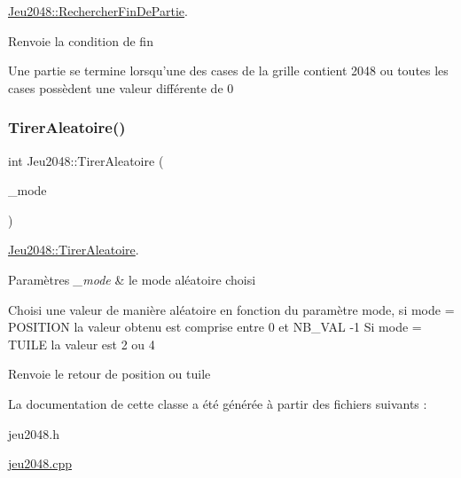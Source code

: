 \hyperlink{class_jeu2048_aa894974e64fc2dd2258b81fd975cdeb3}{Jeu2048\+::\+Rechercher\+Fin\+De\+Partie}. 

\begin{DoxyReturn}{Renvoie}
la condition de fin
\end{DoxyReturn}
Une partie se termine lorsqu’une des cases de la grille contient 2048 ou toutes les cases possèdent une valeur différente de 0 \mbox{\label{class_jeu2048_a5ce3049c89c0dcafc7636cfaf710f07f}} 
\subsubsection{\texorpdfstring{Tirer\+Aleatoire()}{TirerAleatoire()}}
{\footnotesize\ttfamily int Jeu2048\+::\+Tirer\+Aleatoire (\begin{DoxyParamCaption}\item[{const M\+O\+D\+E\+\_\+\+A\+L\+E\+A\+T\+O\+I\+RE}]{\+\_\+mode }\end{DoxyParamCaption})\hspace{0.3cm}{\ttfamily [private]}}



\hyperlink{class_jeu2048_a5ce3049c89c0dcafc7636cfaf710f07f}{Jeu2048\+::\+Tirer\+Aleatoire}. 


\begin{DoxyParams}{Paramètres}
{\em \+\_\+mode} & le mode aléatoire choisi\\
\hline
\end{DoxyParams}
Choisi une valeur de manière aléatoire en fonction du paramètre mode, si mode = P\+O\+S\+I\+T\+I\+ON la valeur obtenu est comprise entre 0 et N\+B\+\_\+\+V\+AL -\/1 Si mode = T\+U\+I\+LE la valeur est 2 ou 4 \begin{DoxyReturn}{Renvoie}
le retour de position ou tuile 
\end{DoxyReturn}


La documentation de cette classe a été générée à partir des fichiers suivants \+:\begin{DoxyCompactItemize}
\item 
jeu2048.\+h\item 
\hyperlink{jeu2048_8cpp}{jeu2048.\+cpp}\end{DoxyCompactItemize}
